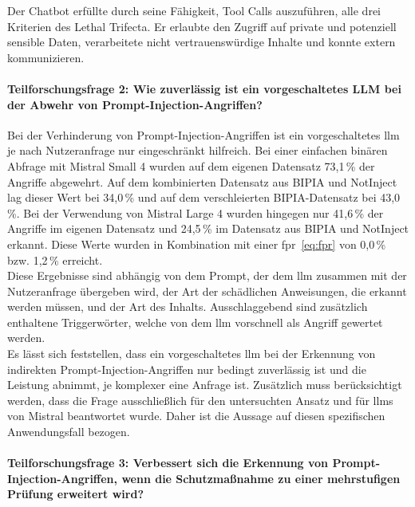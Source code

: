 Der Chatbot erfüllte durch seine Fähigkeit, Tool Calls auszuführen, alle drei Kriterien des Lethal Trifecta. Er erlaubte den Zugriff auf private und potenziell
sensible Daten, verarbeitete nicht vertrauenswürdige Inhalte und konnte extern kommunizieren.

\paragraph{Teilforschungsfrage 2: Wie zuverlässig ist ein vorgeschaltetes LLM bei der Abwehr von Prompt-Injection-Angriffen?}

Bei der Verhinderung von Prompt-Injection-Angriffen ist ein vorgeschaltetes \ac{llm} je nach Nutzeranfrage nur eingeschränkt hilfreich. Bei einer einfachen binären
Abfrage mit Mistral Small 4 wurden auf dem eigenen Datensatz 73,1\,\% der Angriffe abgewehrt. Auf dem kombinierten Datensatz aus BIPIA und NotInject lag
dieser Wert bei 34,0\,\% und auf dem verschleierten BIPIA-Datensatz bei 43,0\,\%. Bei der Verwendung von Mistral Large 4 wurden hingegen nur 41,6\,\% der Angriffe im
eigenen Datensatz und 24,5\,\% im Datensatz aus BIPIA und NotInject erkannt. Diese Werte wurden in Kombination mit einer \ac{fpr}~\eqref{eq:fpr} von 0,0\,\% bzw. 1,2\,\% erreicht. \\
Diese Ergebnisse sind abhängig von dem Prompt, der dem \ac{llm} zusammen mit der Nutzeranfrage übergeben wird, der Art der schädlichen Anweisungen, die
erkannt werden müssen, und der Art des Inhalts. Ausschlaggebend sind zusätzlich enthaltene Triggerwörter, welche von dem \ac{llm} vorschnell als Angriff gewertet werden. \\
Es lässt sich feststellen, dass ein vorgeschaltetes \ac{llm} bei der Erkennung von indirekten Prompt-Injection-Angriffen nur bedingt
zuverlässig ist und die Leistung abnimmt, je komplexer eine Anfrage ist. Zusätzlich muss berücksichtigt werden, dass die Frage ausschließlich für den untersuchten
Ansatz und für \acp{llm} von Mistral beantwortet wurde. Daher ist die Aussage auf diesen spezifischen Anwendungsfall bezogen.

\paragraph{Teilforschungsfrage 3: Verbessert sich die Erkennung von Prompt-Injection-Angriffen, wenn die Schutzmaßnahme zu einer mehrstufigen Prüfung erweitert wird?}

